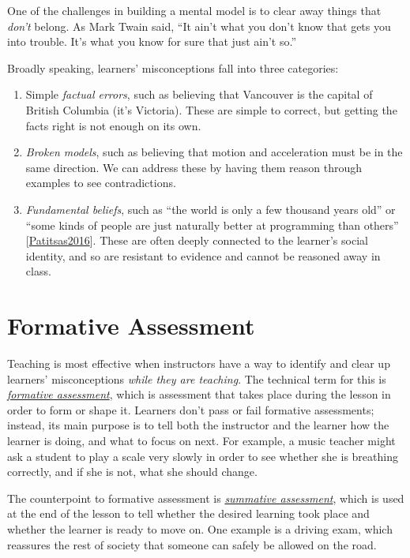 \documentclass[10pt,statementpaper]{memoir}
\begin{document}
One of the challenges in building a mental model is to clear away things
that \emph{don't} belong. As Mark Twain said, ``It ain't what you don't
know that gets you into trouble. It's what you know for sure that just
ain't so.''

Broadly speaking, learners' misconceptions fall into three categories:

\begin{enumerate}
\def\labelenumi{\arabic{enumi}.}
\item
  Simple \emph{factual errors}, such as believing that Vancouver is the
  capital of British Columbia (it's Victoria). These are simple to
  correct, but getting the facts right is not enough on its own.
\item
  \emph{Broken models}, such as believing that motion and acceleration
  must be in the same direction. We can address these by having them
  reason through examples to see contradictions.
\item
  \emph{Fundamental beliefs}, such as ``the world is only a few thousand
  years old'' or ``some kinds of people are just naturally better at
  programming than others''
  {[}\href{biblio.html\#patitsas-cs-grades}{Patitsas2016}{]}. These are
  often deeply connected to the learner's social identity, and so are
  resistant to evidence and cannot be reasoned away in class.
\end{enumerate}

\section{Formative Assessment}\label{formative-assessment}

Teaching is most effective when instructors have a way to identify and
clear up learners' misconceptions \emph{while they are teaching}. The
technical term for this is
\emph{\href{gloss.html\#formative-assessment}{formative assessment}},
which is assessment that takes place during the lesson in order to form
or shape it. Learners don't pass or fail formative assessments; instead,
its main purpose is to tell both the instructor and the learner how the
learner is doing, and what to focus on next. For example, a music
teacher might ask a student to play a scale very slowly in order to see
whether she is breathing correctly, and if she is not, what she should
change.

The counterpoint to formative assessment is
\emph{\href{gloss.html\#summative-assessment}{summative assessment}},
which is used at the end of the lesson to tell whether the desired
learning took place and whether the learner is ready to move on. One
example is a driving exam, which reassures the rest of society that
someone can safely be allowed on the road.
\end{document}
